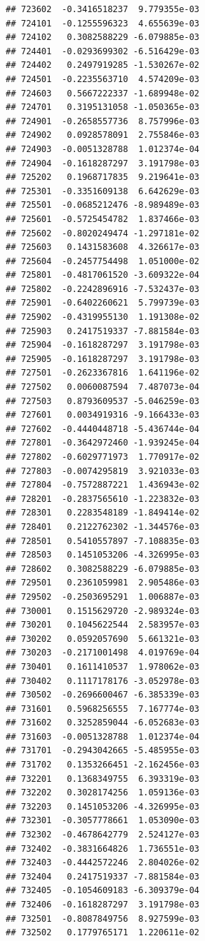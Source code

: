 \begin{frame}[fragile]
\begin{verbatim}
## 723602  -0.3416518237  9.779355e-03
## 724101  -0.1255596323  4.655639e-03
## 724102   0.3082588229 -6.079885e-03
## 724401  -0.0293699302 -6.516429e-03
## 724402   0.2497919285 -1.530267e-02
## 724501  -0.2235563710  4.574209e-03
## 724603   0.5667222337 -1.689948e-02
## 724701   0.3195131058 -1.050365e-03
## 724901  -0.2658557736  8.757996e-03
## 724902   0.0928578091  2.755846e-03
## 724903  -0.0051328788  1.012374e-04
## 724904  -0.1618287297  3.191798e-03
## 725202   0.1968717835  9.219641e-03
## 725301  -0.3351609138  6.642629e-03
## 725501  -0.0685212476 -8.989489e-03
## 725601  -0.5725454782  1.837466e-03
## 725602  -0.8020249474 -1.297181e-02
## 725603   0.1431583608  4.326617e-03
## 725604  -0.2457754498  1.051000e-02
## 725801  -0.4817061520 -3.609322e-04
## 725802  -0.2242896916 -7.532437e-03
## 725901  -0.6402260621  5.799739e-03
## 725902  -0.4319955130  1.191308e-02
## 725903   0.2417519337 -7.881584e-03
## 725904  -0.1618287297  3.191798e-03
## 725905  -0.1618287297  3.191798e-03
## 727501  -0.2623367816  1.641196e-02
## 727502   0.0060087594  7.487073e-04
## 727503   0.8793609537 -5.046259e-03
## 727601   0.0034919316 -9.166433e-03
## 727602  -0.4440448718 -5.436744e-04
## 727801  -0.3642972460 -1.939245e-04
## 727802  -0.6029771973  1.770917e-02
## 727803  -0.0074295819  3.921033e-03
## 727804  -0.7572887221  1.436943e-02
## 728201  -0.2837565610 -1.223832e-03
## 728301   0.2283548189 -1.849414e-02
## 728401   0.2122762302 -1.344576e-03
## 728501   0.5410557897 -7.108835e-03
## 728503   0.1451053206 -4.326995e-03
## 728602   0.3082588229 -6.079885e-03
## 729501   0.2361059981  2.905486e-03
## 729502  -0.2503695291  1.006887e-03
## 730001   0.1515629720 -2.989324e-03
## 730201   0.1045622544  2.583957e-03
## 730202   0.0592057690  5.661321e-03
## 730203  -0.2171001498  4.019769e-04
## 730401   0.1611410537  1.978062e-03
## 730402   0.1117178176 -3.052978e-03
## 730502  -0.2696600467 -6.385339e-03
## 731601   0.5968256555  7.167774e-03
## 731602   0.3252859044 -6.052683e-03
## 731603  -0.0051328788  1.012374e-04
## 731701  -0.2943042665 -5.485955e-03
## 731702   0.1353266451 -2.162456e-03
## 732201   0.1368349755  6.393319e-03
## 732202   0.3028174256  1.059136e-03
## 732203   0.1451053206 -4.326995e-03
## 732301  -0.3057778661  1.053090e-03
## 732302  -0.4678642779  2.524127e-03
## 732402  -0.3831664826  1.736551e-03
## 732403  -0.4442572246  2.804026e-02
## 732404   0.2417519337 -7.881584e-03
## 732405  -0.1054609183 -6.309379e-04
## 732406  -0.1618287297  3.191798e-03
## 732501  -0.8087849756  8.927599e-03
## 732502   0.1779765171  1.220611e-02

\end{verbatim}
\end{frame}
